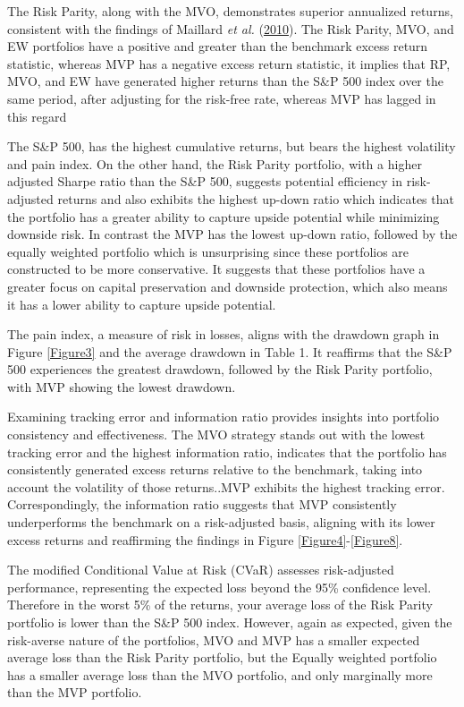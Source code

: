 \documentclass[12pt,preprint, authoryear]{elsarticle}
\numberwithin{equation}{section}
\numberwithin{figure}{section}
\numberwithin{table}{section}
\begin{document}
The Risk Parity, along with the MVO, demonstrates superior annualized
returns, consistent with the findings of Maillard \emph{et al.}
(\protect\hyperlink{ref-maillard2010properties}{2010}). The Risk Parity,
MVO, and EW portfolios have a positive and greater than the benchmark
excess return statistic, whereas MVP has a negative excess return
statistic, it implies that RP, MVO, and EW have generated higher returns
than the S\&P 500 index over the same period, after adjusting for the
risk-free rate, whereas MVP has lagged in this regard

The S\&P 500, has the highest cumulative returns, but bears the highest
volatility and pain index. On the other hand, the Risk Parity portfolio,
with a higher adjusted Sharpe ratio than the S\&P 500, suggests
potential efficiency in risk-adjusted returns and also exhibits the
highest up-down ratio which indicates that the portfolio has a greater
ability to capture upside potential while minimizing downside risk. In
contrast the MVP has the lowest up-down ratio, followed by the equally
weighted portfolio which is unsurprising since these portfolios are
constructed to be more conservative. It suggests that these portfolios
have a greater focus on capital preservation and downside protection,
which also means it has a lower ability to capture upside potential.

The pain index, a measure of risk in losses, aligns with the drawdown
graph in Figure \ref{Figure3} and the average drawdown in Table 1. It
reaffirms that the S\&P 500 experiences the greatest drawdown, followed
by the Risk Parity portfolio, with MVP showing the lowest drawdown.

Examining tracking error and information ratio provides insights into
portfolio consistency and effectiveness. The MVO strategy stands out
with the lowest tracking error and the highest information ratio,
indicates that the portfolio has consistently generated excess returns
relative to the benchmark, taking into account the volatility of those
returns..MVP exhibits the highest tracking error. Correspondingly, the
information ratio suggests that MVP consistently underperforms the
benchmark on a risk-adjusted basis, aligning with its lower excess
returns and reaffirming the findings in Figure
\ref{Figure4}-\ref{Figure8}.

The modified Conditional Value at Risk (CVaR) assesses risk-adjusted
performance, representing the expected loss beyond the 95\% confidence
level. Therefore in the worst 5\% of the returns, your average loss of
the Risk Parity portfolio is lower than the S\&P 500 index. However,
again as expected, given the risk-averse nature of the portfolios, MVO
and MVP has a smaller expected average loss than the Risk Parity
portfolio, but the Equally weighted portfolio has a smaller average loss
than the MVO portfolio, and only marginally more than the MVP portfolio.
\end{document}
